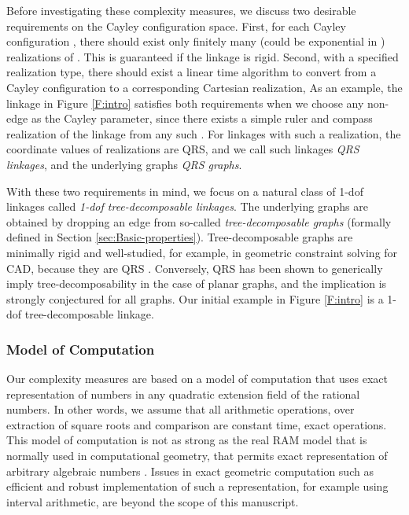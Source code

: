 \documentclass[secthm,amsthm,english]{article}
\theoremstyle{definition}
\theoremstyle{remark}
\begin{document}
Before investigating these complexity measures, 
we discuss two desirable requirements 
on the Cayley configuration space. 
First, for each Cayley configuration ,
there should exist only finitely many (could be exponential in ) 
realizations of . 
This is guaranteed if the linkage  is rigid. 
Second, with a specified realization type, 
there should exist a linear time algorithm to convert 
from a Cayley configuration  to a corresponding Cartesian realization, 
As an example, the linkage in Figure \ref{F:intro} satisfies both requirements 
when we choose any non-edge  as the Cayley parameter, 
since there exists a simple ruler and compass realization of the linkage  from any such . 
For linkages with such a realization, the coordinate values of realizations are QRS, 
and we call such linkages \emph{QRS linkages}, and the underlying graphs \emph{QRS graphs}. 


With these two requirements in mind, 
we focus on a natural class of 1-dof linkages called \emph{1-dof tree-decomposable linkages}. 
The underlying graphs are obtained by dropping an edge from so-called \emph{tree-decomposable graphs} (formally defined in Section \ref{sec:Basic-properties}). 
Tree-decomposable graphs are 
minimally rigid and well-studied, for example, in geometric constraint solving for CAD, because they are QRS \cite{bib:FudHo97}. 
Conversely, QRS has
been shown \cite{bib:Owen02} to generically imply tree-decomposability
in the case of  planar graphs, and the implication is strongly conjectured for
all graphs. 
Our initial example in Figure \ref{F:intro} is a 1-dof tree-decomposable linkage.


\subsubsection{Model of Computation}

Our complexity measures are based on a model of computation that uses exact representation
of numbers in any quadratic extension field of the rational numbers. In other words,
we assume that all arithmetic operations, over extraction of square roots and comparison are
constant time, exact operations. This model of computation is not as strong as the real RAM
model that is normally used in computational geometry, that permits exact representation
of arbitrary algebraic numbers \cite{bib:loos1983computing}. Issues in exact geometric computation such as efficient
and robust implementation of such a representation, for example using interval arithmetic,
are beyond the scope of this manuscript.
\end{document}
